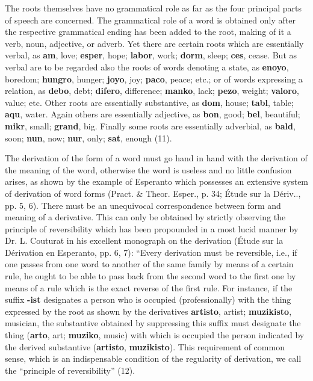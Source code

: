 The roots themselves have no grammatical role as far as the four principal parts of speech are concerned. The grammatical role of a word is obtained only after the respective grammatical ending has been added to the root, making of it a verb, noun, adjective, or adverb. Yet there are certain roots which are essentially verbal, as \textbf{am}, love; \textbf{esper}, hope; \textbf{labor}, work; \textbf{dorm}, sleep; \textbf{ces}, cease. But as verbal are to be regarded also the roots of words denoting a state, as \textbf{enoyo}, boredom; \textbf{hungro}, hunger; \textbf{joyo}, joy; \textbf{paco}, peace; etc.; or of words expressing a relation, as \textbf{debo}, debt; \textbf{difero}, difference; \textbf{manko}, lack; \textbf{pezo}, weight; \textbf{valoro}, value; etc. Other roots are essentially substantive, as \textbf{dom}, house; \textbf{tabl}, table; \textbf{aqu}, water. Again others are essentially adjective, as \textbf{bon}, good; \textbf{bel}, beautiful; \textbf{mikr}, small; \textbf{grand}, big. Finally some roots are essentially adverbial, as \textbf{bald}, soon; \textbf{nun}, now; \textbf{nur}, only; \textbf{sat}, enough (11). \label{parts}

The derivation of the form of a word must go hand in hand with the derivation of the meaning of the word, otherwise the word is useless and no little confusion arises, as shown by the example of Esperanto which possesses an extensive system of derivation of word forms (Pract. \& Theor. Esper., p. 34; Étude sur la Dériv.., pp. 5, 6). There must be an unequivocal correspondence between form and meaning of a derivative. This can only be obtained by strictly observing the principle of reversibility which has been propounded in a most lucid manner by Dr. L. Couturat in his excellent monograph on the derivation (Étude sur la Dérivation en Esperanto, pp. 6, 7): “Every derivation must be reversible, i.e., if one passes from one word to another of the same family by means of a certain rule, he ought to be able to pass back from the second word to the first one by means of a rule which is the exact reverse of the first rule. For instance, if the suffix \textbf{-ist} designates a person who is occupied (professionally) with the thing expressed by the root as shown by the derivatives \textbf{artisto}, artist; \textbf{muzikisto}, musician, the substantive obtained by suppressing this suffix must designate the thing (\textbf{arto}, art; \textbf{muziko}, music) with which is occupied the person indicated by the derived substantive (\textbf{artisto}, \textbf{muzikisto}). This requirement of common sense, which is an indispensable condition of the regularity of derivation, we call the “principle of reversibility” (12). \label{reversibility}

